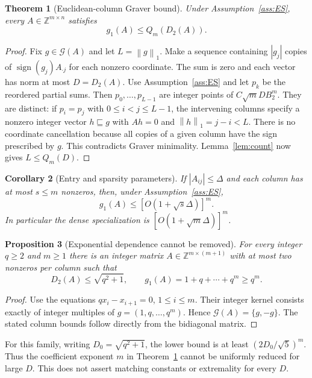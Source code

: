 \documentclass[11pt]{article}
\newtheorem{theorem}{Theorem}[section]
\newtheorem{proposition}[theorem]{Proposition}
\newtheorem{corollary}[theorem]{Corollary}
\theoremstyle{definition}
\theoremstyle{remark}
\newcommand{\Z}{\mathbb Z}
\newcommand{\G}{\mathcal G}
\newcommand{\norm}[1]{\left\lVert #1\right\rVert}
\DeclareMathOperator{\sign}{sign}
\begin{document}
\begin{theorem}[Euclidean-column Graver bound]\label{thm:graver}
Under Assumption~\ref{ass:ES}, every $A\in\Z^{m\times n}$ satisfies
\[
 g_1(A)\le Q_m(D_2(A)).
 \tag{3}\label{eq:graver}
\]
\end{theorem}
\begin{proof}
Fix $g\in\G(A)$ and let $L=\norm g_1$. Make a sequence containing
$|g_j|$ copies of $\sign(g_j)A_{\cdot j}$ for each nonzero coordinate.
The sum is zero and each vector has norm at most $D=D_2(A)$.
Use Assumption~\ref{ass:ES} and let $p_k$ be the reordered partial sums.
Then $p_0,\ldots,p_{L-1}$ are integer points of
$C\sqrt m D B_2^m$. They are distinct: if $p_i=p_j$ with
$0\le i<j\le L-1$, the intervening columns specify a nonzero integer
vector $h\sqsubseteq g$ with $Ah=0$ and
$\norm h_1=j-i<L$. There is no coordinate cancellation because all copies
of a given column have the sign prescribed by $g$. This contradicts
Graver minimality. Lemma~\ref{lem:count} now gives $L\le Q_m(D)$.
\end{proof}

\begin{corollary}[Entry and sparsity parameters]\label{cor:sparse}
If $|A_{ij}|\le\Delta$ and each column has at most $s\le m$ nonzeros,
then, under Assumption~\ref{ass:ES},
\[
 g_1(A)\le [O(1+\sqrt s\Delta)]^m.
\]
In particular the dense specialization is $[O(1+\sqrt m\Delta)]^m$.
\end{corollary}

\begin{proposition}[Exponential dependence cannot be removed]\label{prop:lower}
For every integer $q\ge2$ and $m\ge1$ there is an integer matrix
$A\in\Z^{m\times(m+1)}$ with at most two nonzeros per column such that
\[
 D_2(A)\le\sqrt{q^2+1},\qquad
 g_1(A)=1+q+\cdots+q^m\ge q^m.
\]
\end{proposition}
\begin{proof}
Use the equations $q x_i-x_{i+1}=0$, $1\le i\le m$.
Their integer kernel consists exactly of integer multiples of
$g=(1,q,\ldots,q^m)$. Hence $\G(A)=\{g,-g\}$.
The stated column bounds follow directly from the bidiagonal matrix.
\end{proof}

For this family, writing $D_0=\sqrt{q^2+1}$, the lower bound is at least
$(2D_0/\sqrt5)^m$. Thus the coefficient exponent $m$ in
Theorem~\ref{thm:graver} cannot be uniformly reduced for large $D$.
This does not assert matching constants or extremality for every $D$.
\end{document}
